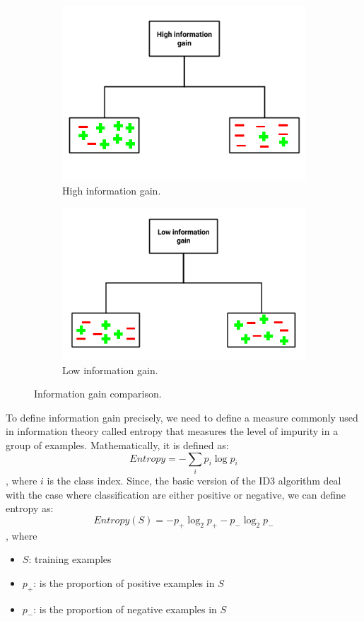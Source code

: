 \begin{figure}[h]
    \centering
    \begin{subfigure}{.4\textwidth}
        \centering
        \includegraphics[scale=.45]{./images/decision_tree/high_gain.png}
        \caption{High information gain.}
        \label{fig:high_gain}
    \end{subfigure}
    \begin{subfigure}{.4\textwidth}
        \centering
        \includegraphics[scale=.45]{./images/decision_tree/low_gain.png}
        \caption{Low information gain.}
        \label{fig:low_gain}
    \end{subfigure}
    \caption{Information gain comparison.}
    \label{fig:info_gain}
\end{figure}

To define information gain precisely, we need to define a measure commonly used in information theory called entropy that measures the level of impurity in a group of examples. Mathematically, it is defined as:
$$Entropy = -\sum_i p_i \log p_i$$
, where $i$ is the class index. Since, the basic version of the ID3 algorithm deal with the case where classification are either positive or negative, we can define entropy as:
$$Entropy(S) = -p_+\log_2 p_+ - p_-\log_2 p_-$$
, where 
\begin{itemize}
    \item $S$: training examples
    \item $p_+$: is the proportion of positive examples in $S$
    \item $p_-$: is the proportion of negative examples in $S$
\end{itemize}

